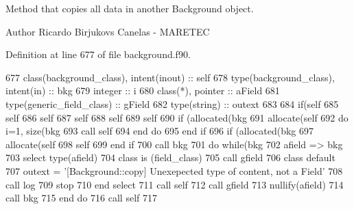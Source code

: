 Method that copies all data in another Background object. 

\begin{DoxyAuthor}{Author}
Ricardo Birjukovs Canelas -\/ M\+A\+R\+E\+T\+EC 
\end{DoxyAuthor}


Definition at line 677 of file background.\+f90.


\begin{DoxyCode}
677     \textcolor{keywordtype}{class}(background\_class), \textcolor{keywordtype}{intent(inout)} :: self
678     \textcolor{keywordtype}{type}(background\_class), \textcolor{keywordtype}{intent(in)} :: bkg
679     \textcolor{keywordtype}{integer} :: i
680     \textcolor{keywordtype}{class}(*), \textcolor{keywordtype}{pointer} :: aField
681     \textcolor{keywordtype}{type}(generic\_field\_class) :: gField
682     \textcolor{keywordtype}{type}(string) :: outext
683 
684     \textcolor{keywordflow}{if}(self%
685     self%
686     self%
687     self%
688     self%
689     self%
690     \textcolor{keywordflow}{if} (\textcolor{keyword}{allocated}(bkg%
691         \textcolor{keyword}{allocate}(self%
692         \textcolor{keywordflow}{do} i=1, \textcolor{keyword}{size}(bkg%
693             \textcolor{keyword}{call }self%
694 \textcolor{keywordflow}{        end do}
695 \textcolor{keywordflow}{    end if}
696     \textcolor{keywordflow}{if} (\textcolor{keyword}{allocated}(bkg%
697         \textcolor{keyword}{allocate}(self%
698         self%
699 \textcolor{keywordflow}{    end if}
700     \textcolor{keyword}{call }bkg%
701     \textcolor{keywordflow}{do} \textcolor{keywordflow}{while}(bkg%
702         afield => bkg%
703         \textcolor{keywordflow}{select type}(afield)
704 \textcolor{keywordflow}{        class is} (field\_class)
705             \textcolor{keyword}{call }gfield%
706 \textcolor{keywordflow}{            class default}
707             outext = \textcolor{stringliteral}{'[Background::copy] Unexepected type of content, not a Field'}
708             \textcolor{keyword}{call }log%
709             stop
710 \textcolor{keywordflow}{        end select}
711         \textcolor{keyword}{call }self%
712         \textcolor{keyword}{call }gfield%
713         \textcolor{keyword}{nullify}(afield)
714         \textcolor{keyword}{call }bkg%
715 \textcolor{keywordflow}{    end do}
716     \textcolor{keyword}{call }self%
717 
\end{DoxyCode}
